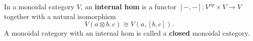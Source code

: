 In a monoidal category $V$, an \textbf{internal hom} is a functor $[-,-]: V^{\text{op}} \times V \rightarrow V$ together with a natural isomorphism
\[
V(a \otimes b, c) \cong V(a, [b, c]).
\]
A monoidal category with an internal hom is called a \textbf{closed} monoidal category.